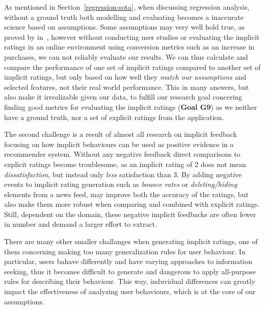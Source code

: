 As mentioned in Section~\ref{regression-sota}, when discussing regression
analysis, without a ground truth both modelling and evaluating becomes a
inaccurate science based on assumptions. Some assumptions may very well hold
true, as proved by in~\cite{parra-2011walk}, however without conducting user
studies or evaluating the implicit ratings in an online environment using
conversion metrics such as an increase in purchases, we can not reliably
evaluate our results. We can thus calculate and compare the performance of one
set of implicit ratings compared to another set of implicit ratings, but only
based on how well they \textit{match our assumptions} and selected features,
not their real world performance. This in many answers, but also make it
irrealizable given our data, to fulfill our research goal concering finding
good metrics for evaluating the implicit ratings (\textbf{Goal G9}) as we
neither have a ground truth, nor a set of explicit ratings from the
application.

The second challenge is a result of almost all research on implicit feedback
focusing on how implicit behaviours can be used as positive evidence in a
recommender system. Without any negative feedback direct comparisons to
explicit ratings become troublesome, as an implicit rating of 2 does not mean
\textit{dissatisfaction}, but instead only \textit{less} satisfaction than 3.
By adding negative events to implicit rating generation such as \textit{bounce
rates} or \textit{deleting/hiding} elements from a news feed, may improve both
the accuracy of the ratings, but also make them more robust when comparing and
combined with explicit ratings. Still, dependent on the domain, these negative
implicit feedbacks are often fewer in number and demand a larger effort to
extract.

There are many other smaller challanges when generating implicit ratings, one
of them concerning making too many generalization rules for user behaviour. In
particular, users bahave differently and have varying approaches to information
seeking, thus it becomes difficult to generate and dangerous to apply
all-purpose rules for describing their behaviour. This way, induvidual
differences can greatly impact the effectiveness of analyzing user behaviours,
which is at the core of our assumptions.

